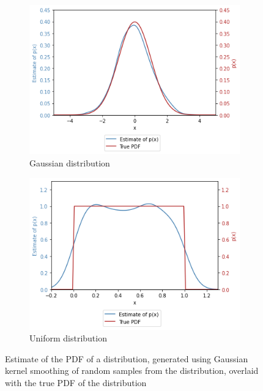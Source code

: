 \documentclass[a4paper]{article}
\begin{document}
\begin{figure}[h]
    \centering
    \begin{subfigure}[b]{0.45\textwidth}
        \centering
        \includegraphics[width=\textwidth]{figures/gaussian_kernel_smoothed.png}
        \caption{Gaussian distribution}
        \label{fig:gaussian_kernel_smoothed}
    \end{subfigure}
    \hfill
    \begin{subfigure}[b]{0.45\textwidth}
        \centering
        \includegraphics[width=\textwidth]{figures/uniform_kernel_smoothed.png}
        \caption{Uniform distribution}
        \label{fig:uniform_kernel_smoothed}
    \end{subfigure}
    \caption{Estimate of the PDF of a distribution, generated using Gaussian kernel smoothing of random samples from the
             distribution, overlaid with the true PDF of the distribution}
    \label{fig:kernel_smoothed}
\end{figure}
\end{document}

